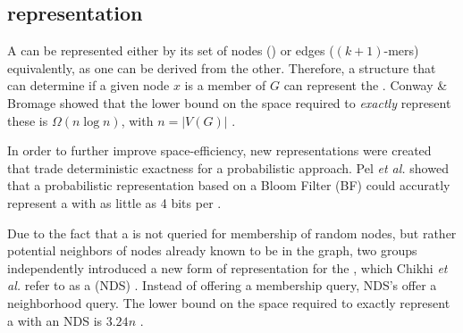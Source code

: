 \subsection{\dBG representation}

A \dBG can be represented either by its set of nodes (\kmers) or edges ($(k+1)$-mers) equivalently, as one can be derived from the other. Therefore, a structure that can determine if a given node $x$ is a member of $G$ can represent the \dBG. Conway \& Bromage showed that the lower bound on the space required to \emph{exactly} represent these  is $\Omega(n \log n)$, with $n=|V(G)|$ \cite{Conway2011}.

In order to further improve space-efficiency, new representations were created that trade deterministic exactness for a probabilistic approach. Pel \emph{et al.} showed that a probabilistic representation based on a Bloom Filter (BF) could accuratly represent a \dBG with as little as 4 bits per \kmer \cite{Pell2012}. 

Due to the fact that a \dBG is not queried for membership of random nodes, but rather potential neighbors of nodes already known to be in the graph, two groups independently introduced a new form of representation for the \dBG \cite{Chikhi2013}\cite{Bowe2012}, which Chikhi \emph{et al.} refer to as a  (NDS) \cite{Chikhi2014}. Instead of offering a membership query, NDS's offer a neighborhood query.  The lower bound on the space required to exactly represent a \dBG with an NDS is $3.24n$ \cite{Chikhi2014}. 



